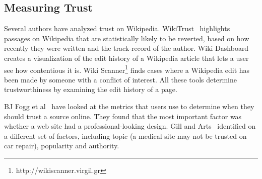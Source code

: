 \documentclass{www2010-submission}
\newcommand{\todo}[1]{}
\begin{document}
\todo{Cite plagarism detection}
\todo{Talk about how our algorithm looks for key terms used in disputed claims}
\todo{Talk about how our first pass NLP algo is rather like }

%
%
%
%
%
%
%
%
%
%


\subsection{Measuring Trust}

Several authors have analyzed trust on Wikipedia. WikiTrust~\cite{Adler2008a} highlights passages on Wikipedia that are statistically likely to be reverted, based on how recently they were written and the track-record of the author. Wiki Dashboard~\cite{Kittur2008} creates a visualization of the edit history of a Wikipedia article that lets a user see how contentious it is. Wiki Scanner\footnote{http://wikiscanner.virgil.gr} finds cases where a Wikipedia edit has been made by someone with a conflict of interest. All these tools determine trustworthiness by examining the edit history of a page.

BJ Fogg et al~\cite{Fogg2000, Fogg2003} have looked at the metrics that users use to determine when they should trust a source online. They found that the most important factor was whether a web site had a professional-looking design. Gill and Arts~\cite{Gil2006} identified on a different set of factors, including topic (a medical site may not be trusted on car repair), popularity and authority.
\end{document}
